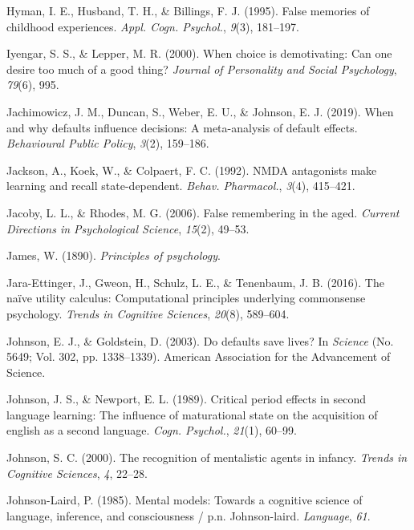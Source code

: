 \documentclass[
]{krantz}
\newlength{\cslhangindent}
\newenvironment{CSLReferences}[2] %
 {\begin{list}{}{%
  \setlength{\itemindent}{0pt}
  \setlength{\leftmargin}{0pt}
  \setlength{\parsep}{0pt}
  \ifodd #1
   \setlength{\leftmargin}{\cslhangindent}
   \setlength{\itemindent}{-1\cslhangindent}
  \fi
  \setlength{\itemsep}{#2\baselineskip}}}
 {\end{list}}
\begin{document}
\begin{CSLReferences}{1}{0}
Hyman, I. E., Husband, T. H., \& Billings, F. J. (1995). False memories of childhood experiences. \emph{Appl. Cogn. Psychol.}, \emph{9}(3), 181--197.

Iyengar, S. S., \& Lepper, M. R. (2000). When choice is demotivating: Can one desire too much of a good thing? \emph{Journal of Personality and Social Psychology}, \emph{79}(6), 995.

Jachimowicz, J. M., Duncan, S., Weber, E. U., \& Johnson, E. J. (2019). When and why defaults influence decisions: A meta-analysis of default effects. \emph{Behavioural Public Policy}, \emph{3}(2), 159--186.

Jackson, A., Koek, W., \& Colpaert, F. C. (1992). {NMDA} antagonists make learning and recall state-dependent. \emph{Behav. Pharmacol.}, \emph{3}(4), 415--421.

Jacoby, L. L., \& Rhodes, M. G. (2006). False remembering in the aged. \emph{Current Directions in Psychological Science}, \emph{15}(2), 49--53.

James, W. (1890). \emph{Principles of psychology}.

Jara-Ettinger, J., Gweon, H., Schulz, L. E., \& Tenenbaum, J. B. (2016). The naïve utility calculus: Computational principles underlying commonsense psychology. \emph{Trends in Cognitive Sciences}, \emph{20}(8), 589--604.

Johnson, E. J., \& Goldstein, D. (2003). Do defaults save lives? In \emph{Science} (No. 5649; Vol. 302, pp. 1338--1339). American Association for the Advancement of Science.

Johnson, J. S., \& Newport, E. L. (1989). Critical period effects in second language learning: The influence of maturational state on the acquisition of english as a second language. \emph{Cogn. Psychol.}, \emph{21}(1), 60--99.

Johnson, S. C. (2000). The recognition of mentalistic agents in infancy. \emph{Trends in Cognitive Sciences}, \emph{4}, 22--28.

Johnson-Laird, P. (1985). Mental models: Towards a cognitive science of language, inference, and consciousness / p.n. Johnson-laird. \emph{Language}, \emph{61}.


\end{CSLReferences}
\end{document}
